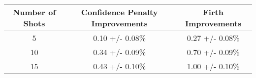 \begin{tabular}{|c|c|c|}
\toprule
 Number of Shots & Confidence Penalty Improvements & Firth Improvements \\
\midrule
               5 &                  0.10 +/- 0.08\% &     0.27 +/- 0.08\% \\
              10 &                  0.34 +/- 0.09\% &     0.70 +/- 0.09\% \\
              15 &                  0.43 +/- 0.10\% &     1.00 +/- 0.10\% \\
\bottomrule
\end{tabular}
